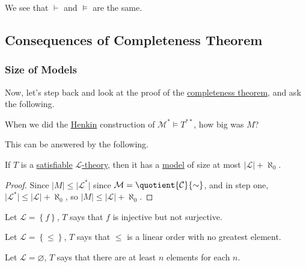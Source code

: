 \begin{remark}
	We see that \(\vdash \) and \(\models \) are the same.
\end{remark}

\subsection{Consequences of Completeness Theorem}
\subsubsection{Size of Models}
Now, let's step back and look at the proof of the \hyperref[thm:completeness]{completeness theorem}, and ask the following.

\begin{problem*}
	When we did the \hyperref[def:Henkin-constant]{Henkin} construction of \(\mathcal{M} ^{\ast} \models T^{\ast\ast }\), how big was \(M\)?
\end{problem*}

This can be answered by the following.

\begin{theorem}\label{thm:model-size}
	If \(T\) is a \hyperref[def:satisfiable]{satisfiable} \hyperref[def:theory]{\(\mathcal{L}\)-theory}, then it has a \hyperref[def:model]{model} of size at most \(\vert \mathcal{L} \vert + \aleph_0\).
\end{theorem}
\begin{proof}
	Since \(\vert M \vert \leq \vert \mathcal{L} ^{\ast} \vert \) since \(\mathcal{M} = \quotient{\mathcal{C} }{\sim } \), and in step one, \(\vert \mathcal{L} ^{\ast} \vert \leq \vert \mathcal{L}  \vert + \aleph_0\), so \(\vert M \vert \leq \vert \mathcal{L}  \vert + \aleph_0\).
\end{proof}

\begin{eg}
	Let \(\mathcal{L} =\left\{ f \right\} \), \(T\) says that \(f\) is injective but not surjective.
\end{eg}

\begin{eg}
	Let \(\mathcal{L} = \left\{ \leq \right\} \), \(T\) says that \(\leq \) is a linear order with no greatest element.
\end{eg}

\begin{eg}
	Let \(\mathcal{L} = \varnothing \), \(T\) says that there are at least \(n\) elements for each \(n\).
\end{eg}

